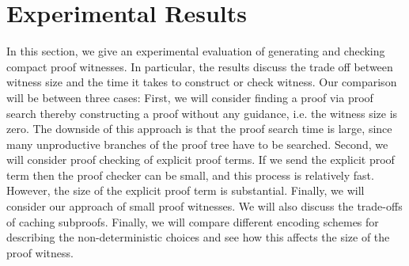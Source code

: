 \documentclass{llncs}
\newcommand{\vd}{\vdash}
\begin{document}







\section{Experimental Results}

In this section, we give an experimental evaluation of generating and
checking compact proof witnesses. In particular, the results discuss
the trade off between witness size and the time it takes to construct
or check witness. Our comparison will be between three cases: First,
we will consider finding a proof via proof search thereby constructing
a proof without any guidance, i.e. the witness size is zero. The
downside of this approach is that the proof search time is large,
since many unproductive branches of the proof tree have to be
searched. Second, we will consider proof checking of explicit proof
terms. If we send the explicit proof term then the proof checker can
be small, and this process is relatively fast. However, the size of
the explicit proof term is substantial. Finally, we will consider our
approach of small proof witnesses. We will also discuss the trade-offs
of caching subproofs. Finally, we will compare different encoding
schemes for describing the non-deterministic choices and see how this
affects the size of the proof witness.
\end{document}

